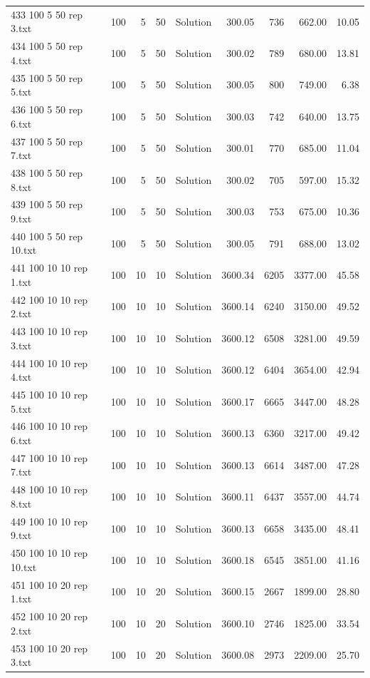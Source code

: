 \begin{longtable}{lrrllrrrr}
433 100 5 50 rep 3.txt & 100 & 5 & 50 & Solution & 300.05 & 736 & 662.00 & 10.05\\
434 100 5 50 rep 4.txt & 100 & 5 & 50 & Solution & 300.02 & 789 & 680.00 & 13.81\\
435 100 5 50 rep 5.txt & 100 & 5 & 50 & Solution & 300.05 & 800 & 749.00 &  6.38\\
436 100 5 50 rep 6.txt & 100 & 5 & 50 & Solution & 300.03 & 742 & 640.00 & 13.75\\
437 100 5 50 rep 7.txt & 100 & 5 & 50 & Solution & 300.01 & 770 & 685.00 & 11.04\\
438 100 5 50 rep 8.txt & 100 & 5 & 50 & Solution & 300.02 & 705 & 597.00 & 15.32\\
439 100 5 50 rep 9.txt & 100 & 5 & 50 & Solution & 300.03 & 753 & 675.00 & 10.36\\
440 100 5 50 rep 10.txt & 100 & 5 & 50 & Solution & 300.05 & 791 & 688.00 & 13.02\\
441 100 10 10 rep 1.txt & 100 & 10 & 10 & Solution & 3600.34 & 6205 & 3377.00 & 45.58\\
442 100 10 10 rep 2.txt & 100 & 10 & 10 & Solution & 3600.14 & 6240 & 3150.00 & 49.52\\
443 100 10 10 rep 3.txt & 100 & 10 & 10 & Solution & 3600.12 & 6508 & 3281.00 & 49.59\\
444 100 10 10 rep 4.txt & 100 & 10 & 10 & Solution & 3600.12 & 6404 & 3654.00 & 42.94\\
445 100 10 10 rep 5.txt & 100 & 10 & 10 & Solution & 3600.17 & 6665 & 3447.00 & 48.28\\
446 100 10 10 rep 6.txt & 100 & 10 & 10 & Solution & 3600.13 & 6360 & 3217.00 & 49.42\\
447 100 10 10 rep 7.txt & 100 & 10 & 10 & Solution & 3600.13 & 6614 & 3487.00 & 47.28\\
448 100 10 10 rep 8.txt & 100 & 10 & 10 & Solution & 3600.11 & 6437 & 3557.00 & 44.74\\
449 100 10 10 rep 9.txt & 100 & 10 & 10 & Solution & 3600.13 & 6658 & 3435.00 & 48.41\\
450 100 10 10 rep 10.txt & 100 & 10 & 10 & Solution & 3600.18 & 6545 & 3851.00 & 41.16\\
451 100 10 20 rep 1.txt & 100 & 10 & 20 & Solution & 3600.15 & 2667 & 1899.00 & 28.80\\
452 100 10 20 rep 2.txt & 100 & 10 & 20 & Solution & 3600.10 & 2746 & 1825.00 & 33.54\\
453 100 10 20 rep 3.txt & 100 & 10 & 20 & Solution & 3600.08 & 2973 & 2209.00 & 25.70\\

\end{longtable}
